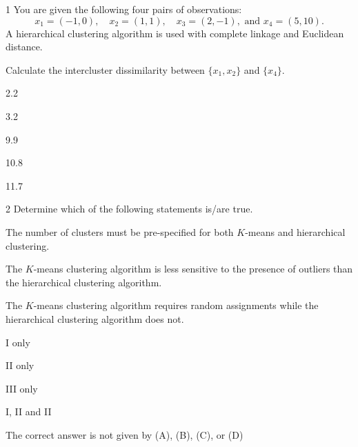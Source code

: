 
\begin{question}{1}
You are given the following four pairs of observations:
\[ x_1 = (-1,0),\quad x_2 = (1,1),\quad x_3 = (2,-1),\text{ and } x_4 = (5,10). \]
A hierarchical clustering algorithm is used with complete linkage and Euclidean distance.

Calculate the intercluster dissimilarity between $\{x_1, x_2\}$ and $\{x_4\}$.

\begin{choices}
\item 2.2
\item 3.2
\item 9.9
\item 10.8
\item 11.7
\end{choices}
\end{question}

\begin{question}{2}
Determine which of the following statements is/are true.
\begin{statements}
\item The number of clusters must be pre-specified for both $K$-means and hierarchical clustering.
\item The $K$-means clustering algorithm is less sensitive to the presence of outliers than the hierarchical clustering algorithm.
\item The $K$-means clustering algorithm requires random assignments while the hierarchical clustering algorithm does not.
\end{statements}

\begin{choices}
\item I only
\item II only
\item III only
\item I, II and II
\item The correct answer is not given by (A), (B), (C), or (D)
\end{choices}
\end{question}

